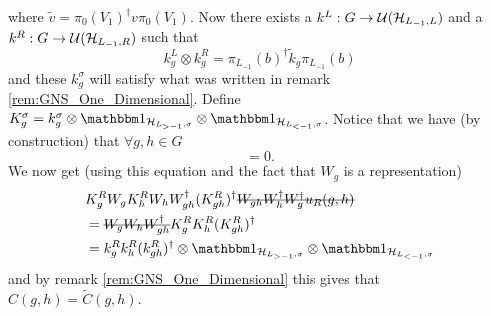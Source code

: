\documentclass[11pt,a4paper,twoside]{article}
\numberwithin{equation}{section}
\begin{document}
where $\tilde{v}=\pi_0(V_1)^\dagger v\pi_0(V_1)$. Now there exists a $k^L:G\rightarrow \mathcal U(\mathcal H_{L_{-1},L})$ and a $k^R:G\rightarrow \mathcal U(\mathcal H_{L_{-1},R})$ such that
\begin{equation}
	k^L_g\otimes k^R_g=\pi_{L_{-1}}(b)^\dagger \tilde k_g \pi_{L_{-1}}(b)
\end{equation}
and these $k^\sigma_g$ will satisfy what was written in remark \ref{rem:GNS_One_Dimensional}. Define $K^\sigma_g=k^\sigma_g\otimes\id_{\HH_{L_{>-1},\sigma}}\otimes\id_{\HH_{L_{<-1},\sigma}}$. Notice that we have (by construction) that $\forall g,h\in G$
\begin{equation}
	[K^\sigma_g\otimes\id_{\HH_{\ZZ^2/\sigma}},W_h]=0.
\end{equation}
We now get (using this equation and the fact that $W_g$ is a representation)
\begin{align}
	&K_g^R W_g K_h^R W_h W_{gh}^\dagger (K_{gh}^R)^\dagger \stkout{W_{gh}W_h^\dagger W_g^\dagger u_R(g,h)}\\
	&=\stkout{W_g W_h W_{gh}^\dagger} K_g^R K_h^R (K_{gh}^R)^\dagger\\
	&=k_g^R k_h^R (k_{gh}^R)^\dagger\otimes \id_{\HH_{L_{>-1},\sigma}}\otimes\id_{\HH_{L_{<-1},\sigma}}
\end{align}
and by remark \ref{rem:GNS_One_Dimensional} this gives that $C(g,h)=\tilde{C}(g,h)$.
\end{document}
